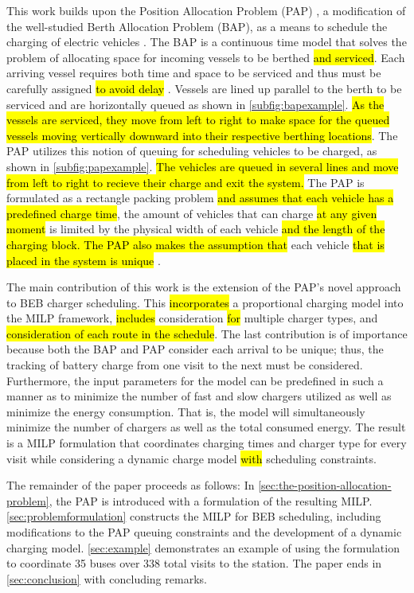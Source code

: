 \documentclass[utf8]{FrontiersinHarvard}
\let\cite\citep                                       %
\newcommand{\A}{35 }                                                            %
\newcommand{\N}{338 }                                                           %
\begin{document}
This work builds upon the Position Allocation Problem (PAP) \cite{qarebagh-2019-optim-sched}, a modification of the
well-studied Berth Allocation Problem (BAP), as a means to schedule the charging of electric vehicles
\cite{buhrkal-2011-model-discr,frojan-2015-contin-berth,imai-2001-dynam-berth}. The BAP is a continuous time model
that solves the problem of allocating space for incoming vessels to be berthed \hl{and serviced}. Each
arriving vessel requires both time and space to be serviced and thus must be carefully assigned \hl{to avoid delay} \cite{imai-2001-dynam-berth}. Vessels are lined up parallel to the berth to be serviced and are horizontally
queued as shown in \autoref{subfig:bapexample}. \hl{As the vessels are serviced, they move from left to right to make space for the queued vessels moving vertically downward into their respective berthing locations}. The PAP
utilizes this notion of queuing for scheduling vehicles to be charged, as shown in \autoref{subfig:papexample}.
\hl{The vehicles are queued in several lines and move from left to right to recieve their charge and exit the system.} The PAP is formulated as a rectangle packing problem \hl{and assumes that each vehicle has a predefined charge time}, the amount of vehicles that can charge \hl{at any given moment} is limited by the
physical width of each vehicle \hl{and the length of the charging block. The PAP also makes the assumption that} each vehicle \hl{that is placed in the system is unique} \cite{qarebagh-2019-optim-sched}.

The main contribution of this work is the extension of the PAP's novel approach to BEB charger scheduling. This
\hl{incorporates} a proportional charging model into the MILP framework, \hl{includes}
consideration \hl{for} multiple charger types, and \hl{consideration of each route in the schedule}. The last contribution is of importance because both the BAP and PAP consider each arrival to be unique;
thus, the tracking of battery charge from one visit to the next must be considered. Furthermore, the input parameters
for the model can be predefined in such a manner as to minimize the number of fast and slow chargers utilized as well as
minimize the energy consumption. That is, the model will simultaneously minimize the number of chargers as well as the
total consumed energy. The result is a MILP formulation that coordinates charging times and charger type for every visit
while considering a dynamic charge model \hl{with} scheduling constraints.

The remainder of the paper proceeds as follows: In \autoref{sec:the-position-allocation-problem}, the PAP is introduced
with a formulation of the resulting MILP. \autoref{sec:problemformulation} constructs the MILP for BEB scheduling,
including modifications to the PAP queuing constraints and the development of a dynamic charging model.
\autoref{sec:example} demonstrates an example of using the formulation to coordinate \A buses over \N total visits to
the station. The paper ends in \autoref{sec:conclusion} with concluding remarks.
\end{document}
